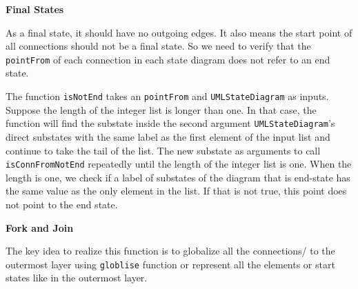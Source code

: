 \textbf{Final States}

As a final state, it should have no outgoing edges. It also means the start point of all connections should not be a final state. So we need to verify that the \verb|pointFrom| of each connection in each state diagram does not refer to an end state.

The function \verb|isNotEnd| takes an \verb|pointFrom| and \verb|UMLStateDiagram| as inputs.
Suppose the length of the integer list is longer than one. 
In that case, the function will find the substate inside the second argument \verb|UMLStateDiagram|'s direct substates with the same label as the first element of the input list 
and continue to take the tail of the list. 
The new substate as arguments to call \verb|isConnFromNotEnd| repeatedly until the length of the integer list is one.
When the length is one, we check if a label of substates of the diagram that is end-state has the same value as the only element in the list.
If that is not true, this point does not point to the end state.

\textbf{Fork and Join}

The key idea to realize this function is to globalize all the connections/ to the outermost layer using \verb|globlise| function or represent all the elements or start states like in the outermost layer.

